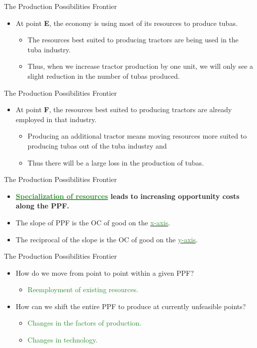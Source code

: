 \documentclass[xcolor={dvipsnames},pdf, hyperref={colorlinks=true, citecolor=ForestGreen, linkcolor=BlueViolet, urlcolor=Magenta}]{beamer}
\newcommand{\ddp}[1]{{\textcolor{ForestGreen}{#1}}}
\newcommand{\dd}[1]{{\underline{\textcolor{ForestGreen}{#1}}}}
\begin{document}
\begin{frame}{The Production Possibilities Frontier}
\begin{itemize}
	\item	At point \textbf{E}, the economy is using most of its resources to produce tubas. 
	\begin{itemize}
		\item The resources best suited to producing tractors are being used in the tuba industry. 
		\item Thus, when we increase tractor production by one unit, we will only see a slight reduction in the number of tubas produced. 
	\end{itemize}
\end{itemize}	
\end{frame}

\begin{frame}{The Production Possibilities Frontier}
\begin{itemize}
		\item At point \textbf{F}, the resources best suited to producing tractors are already employed in that industry.
	\begin{itemize} 
		\item Producing an additional tractor means moving resources more suited to producing tubas out of the tuba industry and \item Thus there will be a large loss in the production of tubas.
	\end{itemize}
\end{itemize}
\end{frame}

\begin{frame}{The Production Possibilities Frontier}
	\begin{itemize}
	\item 	\textbf{\dd{Specialization of resources} leads to increasing opportunity costs along the PPF.}
	\item  	The slope of PPF is the OC of good on the \dd{x-axis}. 
	\item The reciprocal of the slope is the OC of good on the \dd{y-axis}.
	\end{itemize}
\end{frame}

\begin{frame}{The Production Possibilities Frontier}
	\begin{itemize}
		\item How do we move from point to point within a given PPF?
		  \begin{itemize}
		  	\item \ddp{Reemployment of existing resources.}
		  \end{itemize}
		\item How can we shift the entire PPF to produce at currently unfeasible points?
			\begin{itemize}
				\item \ddp{Changes in the factors of production.}  
				\item \ddp{Changes in technology.}
			\end{itemize}
	\end{itemize}
\end{frame}
\end{document}
